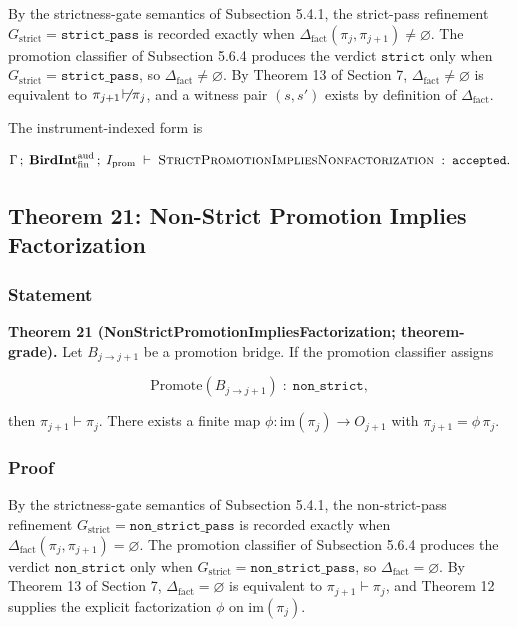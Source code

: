 \documentclass[11pt]{article}
\providecommand{\factor}{\mathrel{\!\vdash\!}}
\theoremstyle{definition}
\begin{document}
By the strictness-gate semantics of Subsection 5.4.1, the strict-pass refinement \(G_{\mathrm{strict}}=\texttt{strict\_pass}\) is recorded exactly when \(\Delta_{\mathrm{fact}}(\pi_j,\pi_{j+1})\neq\varnothing\). The promotion classifier of Subsection 5.6.4 produces the verdict \(\texttt{strict}\) only when \(G_{\mathrm{strict}}=\texttt{strict\_pass}\), so \(\Delta_{\mathrm{fact}}\neq\varnothing\). By Theorem 13 of Section 7, \(\Delta_{\mathrm{fact}}\neq\varnothing\) is equivalent to \(\pi_{j+1}\not\factor\pi_j\), and a witness pair \((s,s')\) exists by definition of \(\Delta_{\mathrm{fact}}\).

The instrument-indexed form is

\[
\Gamma\,;\;\mathbf{BirdInt}^{\mathrm{aud}}_{\mathrm{fin}}\,;\;I_{\mathrm{prom}}\;\vdash\;\textsc{StrictPromotionImpliesNonfactorization}\;:\;\texttt{accepted}.
\]

\subsection{Theorem 21: Non-Strict Promotion Implies Factorization}

\subsubsection{Statement}

\textbf{Theorem 21 (NonStrictPromotionImpliesFactorization; theorem-grade).} Let \(B_{j\to j+1}\) be a promotion bridge. If the promotion classifier assigns

\[
\mathrm{Promote}(B_{j\to j+1})\;:\;\texttt{non\_strict},
\]

then \(\pi_{j+1}\factor\pi_j\). There exists a finite map \(\phi:\mathrm{im}(\pi_j)\to O_{j+1}\) with \(\pi_{j+1}=\phi\,\pi_j\).

\subsubsection{Proof}

By the strictness-gate semantics of Subsection 5.4.1, the non-strict-pass refinement \(G_{\mathrm{strict}}=\texttt{non\_strict\_pass}\) is recorded exactly when \(\Delta_{\mathrm{fact}}(\pi_j,\pi_{j+1})=\varnothing\). The promotion classifier of Subsection 5.6.4 produces the verdict \(\texttt{non\_strict}\) only when \(G_{\mathrm{strict}}=\texttt{non\_strict\_pass}\), so \(\Delta_{\mathrm{fact}}=\varnothing\). By Theorem 13 of Section 7, \(\Delta_{\mathrm{fact}}=\varnothing\) is equivalent to \(\pi_{j+1}\factor\pi_j\), and Theorem 12 supplies the explicit factorization \(\phi\) on \(\mathrm{im}(\pi_j)\).
\end{document}

